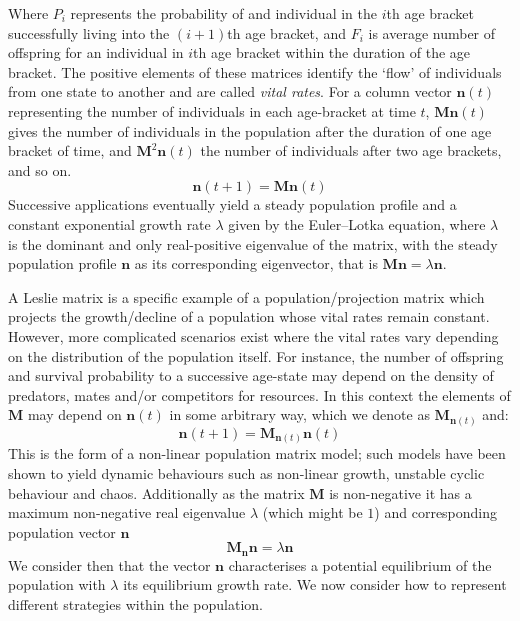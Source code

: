 Where $P_i$ represents the probability of and individual in the $i$th age bracket successfully living into the $(i+1)$th age bracket, and $F_i$ is average number of offspring for an individual in $i$th age bracket within the duration of the age bracket.
The positive elements of these matrices identify the `flow' of individuals from one state to another and are called \textit{vital rates}.
For a column vector $\mathbf{n}(t)$ representing the number of individuals in each age-bracket at time $t$, $\mathbf{M}\mathbf{n}(t)$ gives the number of individuals in the population after the duration of one age bracket of time, and $\mathbf{M}^2\mathbf{n}(t)$ the number of individuals after two age brackets, and so on. $$\mathbf{n}(t+1)=\mathbf{M}\mathbf{n}(t)$$
Successive applications eventually yield a steady population profile and a constant exponential growth rate $\lambda$ given by the Euler–Lotka equation, where $\lambda$ is the dominant and only real-positive eigenvalue of the matrix, with the steady population profile $\mathbf{n}$ as its corresponding eigenvector, that is $\mathbf{M}\mathbf{n}=\lambda \mathbf{n}$.

A Leslie matrix is a specific example of a population/projection matrix which projects the growth/decline of a population whose vital rates remain constant.
However, more complicated scenarios exist where the vital rates vary depending on the distribution of the population itself.
For instance, the number of offspring and survival probability to a successive age-state may depend on the density of predators, mates and/or competitors for resources.
In this context the elements of $\mathbf{M}$ may depend on $\mathbf{n}(t)$ in some arbitrary way, which we denote as $\mathbf{M}_{\mathbf{n}(t)}$ and:
$$\mathbf{n}(t+1) = \mathbf{M}_{\mathbf{n}(t)}\mathbf{n}(t)$$
This is the form of a non-linear population matrix model; such models have been shown to yield dynamic behaviours such as non-linear growth, unstable cyclic behaviour and chaos.
Additionally as the matrix $\mathbf{M}$ is non-negative it has a maximum non-negative real eigenvalue $\lambda$ (which might be $1$) and corresponding population vector $\mathbf{n}$
$$\mathbf{M}_{\mathbf{n}}\mathbf{n} = \lambda\mathbf{n}$$
We consider then that the vector $\mathbf{n}$ characterises a potential equilibrium of the population with $\lambda$ its equilibrium growth rate. We now consider how to represent different strategies within the population.


